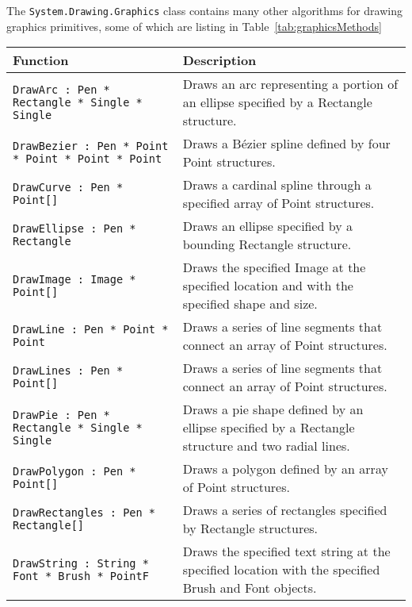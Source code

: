 The \lstinline!System.Drawing.Graphics! class contains many other algorithms for drawing graphics primitives, some of which are listing in Table~\ref{tab:graphicsMethods}
\begin{table}
  \begin{center}
    \begin{tabularx}{\linewidth}{|l|X|}
      \hline
      \rowcolor{headerRowColor}  Function & Description\\
      \hline
      \lstinline{DrawArc : Pen * Rectangle * Single * Single}
      &Draws an arc representing a portion of an ellipse specified by a Rectangle structure.\\
      \hline
      \lstinline{DrawBezier : Pen * Point * Point * Point * Point}	
      &Draws a Bézier spline defined by four Point structures.\\
      \hline
      \lstinline{DrawCurve : Pen * Point[]}	
      &Draws a cardinal spline through a specified array of Point structures.\\
      \hline
      \lstinline{DrawEllipse : Pen * Rectangle}	
      &Draws an ellipse specified by a bounding Rectangle structure.\\
      \hline
      \lstinline{DrawImage : Image * Point[]}	
      &Draws the specified Image at the specified location and with the specified shape and size.\\
      \hline
      \lstinline{DrawLine : Pen * Point * Point}	
      &Draws a series of line segments that connect an array of Point structures.\\
      \hline
      \lstinline{DrawLines : Pen * Point[]}	
      &Draws a series of line segments that connect an array of Point structures.\\
      \hline
      \lstinline{DrawPie : Pen * Rectangle * Single * Single}	
      &Draws a pie shape defined by an ellipse specified by a Rectangle structure and two radial lines.\\
      \hline
      \lstinline{DrawPolygon : Pen * Point[]}	
      &Draws a polygon defined by an array of Point structures.\\
      \hline
      \lstinline{DrawRectangles : Pen * Rectangle[]}	
      &Draws a series of rectangles specified by Rectangle structures.\\
      \hline
      \lstinline{DrawString : String * Font * Brush * PointF}	
      &Draws the specified text string at the specified location with the specified Brush and Font objects.\\

\end{tabularx}
\end{center}
\end{table}
